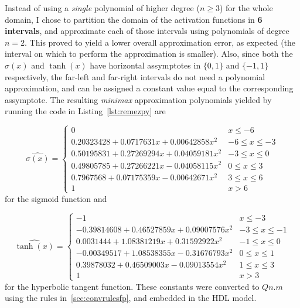 Instead of using a \emph{single} polynomial of higher degree ($n \geq 3$) for the whole domain, I chose to partition the domain of the activation functions in \textbf{6 intervals}, and approximate each of those intervals using polynomials of degree $n=2$. This proved to yield a lower overall approximation error, as expected (the interval on which to perform the approximation is smaller). Also, since both the $\sigma(x)$ and $\tanh(x)$ have horizontal assymptotes in $\{0,1\}$ and $\{-1,1\}$ respectively, the far-left and far-right intervals do not need a polynomial approximation, and can be assigned a constant value equal to the corresponding assymptote. The resulting \textit{minimax} approximation polynomials yielded by running the code in Listing~\ref{lst:remezpy} are

\begin{equation}\label{eq:coefs_sigm}
\hat{\sigma(x)} = \left\{ 
\begin{array}{lc} 
0 & x  \leq -6 \\
0.20323428 + 0.0717631x + 0.00642858x^2 & -6 \leq x \leq -3 \\
0.50195831 + 0.27269294x + 0.04059181x^2 & -3 \leq  x \leq 0 \\
0.49805785 + 0.27266221x - 0.04058115x^2 &  0 \leq  x \leq 3 \\
0.7967568 + 0.07175359x - 0.00642671x^2 & 3 \leq  x \leq 6 \\
1 & x > 6
\end{array}
\right.
\end{equation}
for the sigmoid function and

\begin{equation}\label{eq:coefs_tanh}
\hat{\tanh(x)} = \left\{ 
\begin{array}{lc} 
-1 & x  \leq -3 \\
-0.39814608 + 0.46527859x + 0.09007576x^2 & -3 \leq x \leq -1 \\
0.0031444 + 1.08381219x + 0.31592922x^2 & -1 \leq  x \leq 0 \\
-0.00349517 + 1.08538355x -0.31676793x^2 &  0 \leq  x \leq 1 \\
0.39878032 + 0.46509003x - 0.09013554x^2 & 1 \leq  x \leq 3 \\
1 & x > 3
\end{array}
\right.
\end{equation}
for the hyperbolic tangent function. These constants were converted to $Qn.m$ using the rules in~\ref{sec:convrulesfp}, and embedded in the HDL model.


